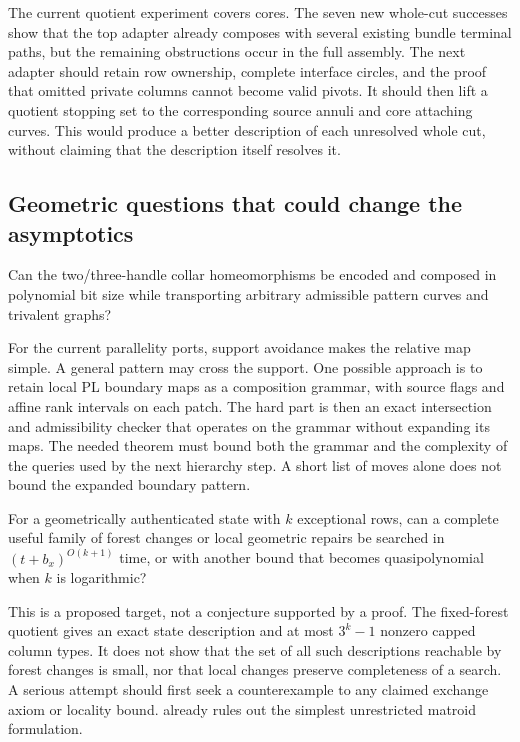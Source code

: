 The current quotient experiment covers cores. The seven new whole-cut
successes show that the top adapter already composes with several existing
bundle terminal paths, but the remaining obstructions occur in the full
assembly. The next adapter should retain row ownership, complete interface
circles, and the proof that omitted private columns cannot become valid
pivots. It should then lift a quotient stopping set to the corresponding
source annuli and core attaching curves. This would produce a better
description of each unresolved whole cut, without claiming that the
description itself resolves it.

\subsection{Geometric questions that could change the asymptotics}

\begin{question}
Can the two/three-handle collar homeomorphisms be encoded and composed in
polynomial bit size while transporting arbitrary admissible pattern curves
and trivalent graphs?
\end{question}

For the current parallelity ports, support avoidance makes the relative map
simple. A general pattern may cross the support. One possible approach is
to retain local PL boundary maps as a composition grammar, with source
flags and affine rank intervals on each patch. The hard part is then an
exact intersection and admissibility checker that operates on the grammar
without expanding its maps. The needed theorem must bound both the grammar
and the complexity of the queries used by the next hierarchy step. A
short list of moves alone does not bound the expanded boundary pattern.

\begin{question}
For a geometrically authenticated state with $k$ exceptional rows, can a
complete useful family of forest changes or local geometric repairs be
searched in $(t+b_x)^{O(k+1)}$ time, or with another bound that becomes
quasipolynomial when $k$ is logarithmic?
\end{question}

This is a proposed target, not a conjecture supported by a proof. The
fixed-forest quotient gives an exact state description and at most
$3^k-1$ nonzero capped column types. It does not show that the set of all
such descriptions reachable by forest changes is small, nor that local
changes preserve completeness of a search. A serious attempt should first
seek a counterexample to any claimed exchange axiom or locality bound.
 already rules out the simplest unrestricted
matroid formulation.

